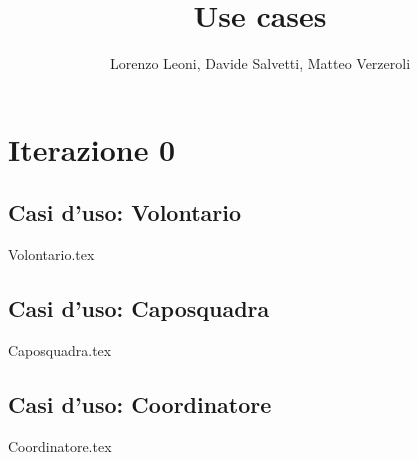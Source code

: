 \documentclass[
		a4paper,
		cleardoublepage=empty,
		headings=twolinechapter,
		numbers=autoenddot,
]{article}
\title{Use cases}
\author{Lorenzo Leoni, Davide Salvetti, Matteo Verzeroli}
\begin{document}
	\maketitle
	\section{Iterazione 0}
	\subsection{Casi d'uso: Volontario}
	{Volontario.tex}
	\subsection{Casi d'uso: Caposquadra}
	{Caposquadra.tex}
	\subsection{Casi d'uso: Coordinatore}
	{Coordinatore.tex}
\end{document}
